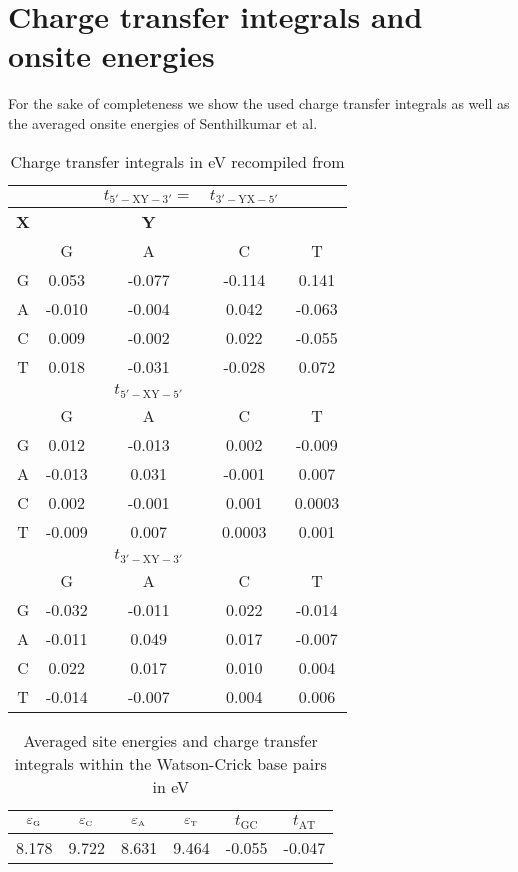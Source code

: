 \documentclass[reprint,superscriptaddress,nofootinbib,amsmath,amssymb,prb,floatfix]{revtex4-1}
\begin{document}
\section{Charge transfer integrals and onsite energies}
\label{params}

For the sake of completeness we show the used charge transfer integrals as well as the averaged onsite energies of Senthilkumar et al. \cite{senthilkumar_absolute_2005}

\begin{table}[H] %
\centering
\caption{Charge transfer integrals in eV recompiled from \cite{senthilkumar_absolute_2005} \label{table:CT}}
\begin{tabular}{c||cccc}
&&$t_{5'-\text{XY}-3'} = $ &$t_{3'-\text{YX}-5'}$& \\ \hline\hline
\textbf{X} &  & \textbf{Y}  & &  \\ \hline
 &  G & A & C & T \\ \hline
G &  0.053  & -0.077& -0.114& 0.141 \\ 
A & -0.010 & -0.004 & 0.042 & -0.063 \\ 
C & 0.009 & -0.002 & 0.022 & -0.055 \\ 
T & 0.018 & -0.031 & -0.028 & 0.072 \\ \hline
&  & $t_{5'-\text{XY}-5'}$  & &  \\ \hline \hline
 &  G & A & C & T \\ \hline
G &  0.012 & -0.013 &  0.002  & -0.009 \\ 
A & -0.013 &  0.031 & -0.001  & 0.007 \\ 
C &  0.002 & -0.001 &  0.001  & 0.0003 \\ 
T & -0.009 &  0.007 &  0.0003 & 0.001 \\ \hline
 &  & $t_{3'-\text{XY}-3'}$  & &  \\ \hline \hline
 &  G & A & C & T \\ \hline
G & -0.032 & -0.011 & 0.022 & -0.014 \\ 
A & -0.011 &  0.049 & 0.017 & -0.007 \\ 
C &  0.022 &  0.017 & 0.010 &  0.004 \\ 
T & -0.014 & -0.007 & 0.004 &  0.006 \\ \hline 
\end{tabular}
\end{table}

\begin{table}[H] %
\centering
\caption{Averaged site energies and charge transfer integrals within the Watson-Crick base pairs in eV \label{table:site}}
\begin{tabular}{cccccc}
$\varepsilon_\text{\tiny G}$ & $\varepsilon_\text{\tiny C}$ & $\varepsilon_\text{\tiny A}$ & $\varepsilon_\text{\tiny T}$&$t_{\text{GC}}$ &$t_{\text{AT}}$ \\ \hline
8.178 & 9.722 & 8.631 & 9.464&-0.055&-0.047
\end{tabular}
\end{table}
\end{document}
